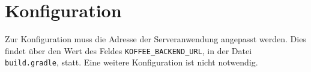 \section{Konfiguration}
\label{sec:app:configuration}
Zur Konfiguration muss die Adresse der Serveranwendung angepasst werden.
Dies findet über den Wert des Feldes \verb|KOFFEE_BACKEND_URL|, in der Datei \verb|build.gradle|, statt.
Eine weitere Konfiguration ist nicht notwendig.
